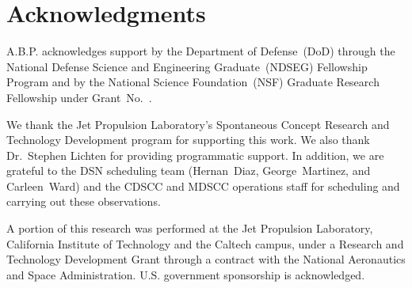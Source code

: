 \documentclass[twocolumn]{emulateapj}
\begin{document}
 \section{Acknowledgments}

A.B.P. acknowledges support by the Department of Defense~(DoD) through the National Defense Science and Engineering Graduate~(NDSEG) Fellowship Program and by the National Science Foundation~(NSF) Graduate Research Fellowship under Grant~No.~.

We thank the Jet Propulsion Laboratory's Spontaneous Concept Research and Technology Development program for supporting this work. We also thank Dr.~Stephen Lichten for providing programmatic support. In addition, we are grateful to the DSN scheduling team (Hernan~Diaz, George~Martinez, and Carleen~Ward) and the CDSCC and MDSCC operations staff for scheduling and carrying out these observations.

A portion of this research was performed at the Jet Propulsion Laboratory, California Institute of Technology and the Caltech campus, under a Research and Technology Development Grant through a contract with the National Aeronautics and Space Administration. U.S. government sponsorship is acknowledged.


 
\end{document}
